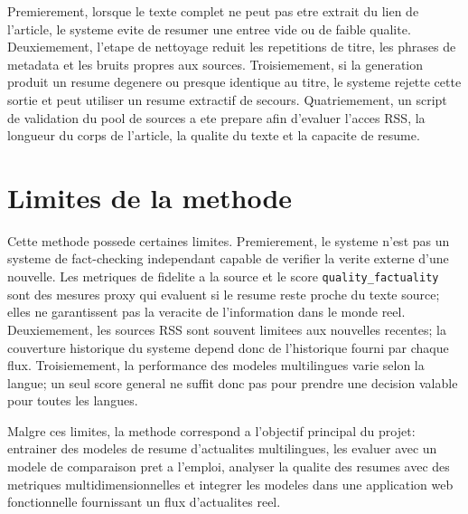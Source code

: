 Premierement, lorsque le texte complet ne peut pas etre extrait du lien de l'article, le systeme evite de resumer une entree vide ou de faible qualite. Deuxiemement, l'etape de nettoyage reduit les repetitions de titre, les phrases de metadata et les bruits propres aux sources. Troisiemement, si la generation produit un resume degenere ou presque identique au titre, le systeme rejette cette sortie et peut utiliser un resume extractif de secours. Quatriemement, un script de validation du pool de sources a ete prepare afin d'evaluer l'acces RSS, la longueur du corps de l'article, la qualite du texte et la capacite de resume.

\section{Limites de la methode}

Cette methode possede certaines limites. Premierement, le systeme n'est pas un systeme de fact-checking independant capable de verifier la verite externe d'une nouvelle. Les metriques de fidelite a la source et le score \texttt{quality\_factuality} sont des mesures proxy qui evaluent si le resume reste proche du texte source; elles ne garantissent pas la veracite de l'information dans le monde reel. Deuxiemement, les sources RSS sont souvent limitees aux nouvelles recentes; la couverture historique du systeme depend donc de l'historique fourni par chaque flux. Troisiemement, la performance des modeles multilingues varie selon la langue; un seul score general ne suffit donc pas pour prendre une decision valable pour toutes les langues.

Malgre ces limites, la methode correspond a l'objectif principal du projet: entrainer des modeles de resume d'actualites multilingues, les evaluer avec un modele de comparaison pret a l'emploi, analyser la qualite des resumes avec des metriques multidimensionnelles et integrer les modeles dans une application web fonctionnelle fournissant un flux d'actualites reel.
